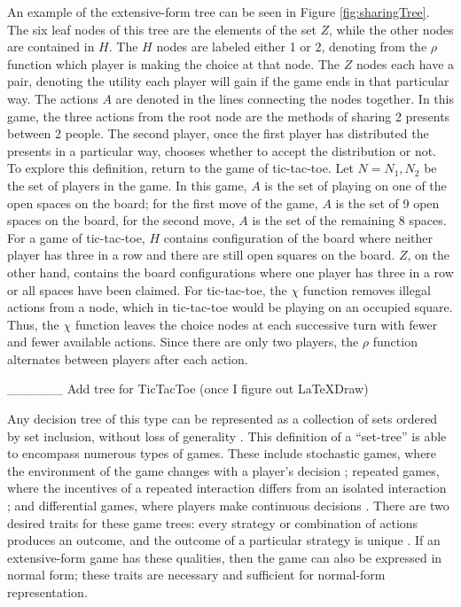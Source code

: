 An example of the extensive-form tree can be seen in Figure \ref{fig:sharingTree}. The six leaf nodes of this tree are the elements of the set $Z$, while the other nodes are contained in $H$. The $H$ nodes are labeled either 1 or 2, denoting from the $\rho$ function which player is making the choice at that node. The $Z$ nodes each have a pair, denoting the utility each player will gain if the game ends in that particular way. The actions $A$ are denoted in the lines connecting the nodes together. In this game, the three actions from the root node are the methods of sharing 2 presents between 2 people. The second player, once the first player has distributed the presents in a particular way, chooses whether to accept the distribution or not.\\

To explore this definition, return to the game of tic-tac-toe. Let $N={N_1, N_2}$ be the set of players in the game. In this game, $A$ is the set of playing on one of the open spaces on the board; for the first move of the game, $A$ is the set of 9 open spaces on the board, for the second move, $A$ is the set of the remaining 8 spaces. For a game of tic-tac-toe, $H$ contains configuration of the board where neither player has three in a row and there are still open squares on the board. $Z$, on the other hand, contains the board configurations where one player has three in a row or all spaces have been claimed. For tic-tac-toe, the $\chi$ function removes illegal actions from a node, which in tic-tac-toe would be playing on an occupied square. Thus, the $\chi$ function leaves the choice nodes at each successive turn with fewer and fewer available actions. Since there are only two players, the $\rho$ function alternates between players after each action.

\_\_\_\_\_\_ Add tree for TicTacToe (once I figure out LaTeXDraw)

Any decision tree of this type can be represented as a collection of sets ordered by set inclusion, without loss of generality \cite{alos08}. This definition of a ``set-tree'' is able to encompass numerous types of games. These include stochastic games, where the environment of the game changes with a player's decision \cite{sola15}; repeated games, where the incentives of a repeated interaction differs from an isolated interaction \cite{mail06}; and differential games, where players make continuous decisions \cite{alos08}. There are two desired traits for these game trees: every strategy or combination of actions produces an outcome, and the outcome of a particular strategy is unique \cite{alos08}. If an extensive-form game has these qualities, then the game can also be expressed in normal form; these traits are necessary and sufficient for normal-form representation.